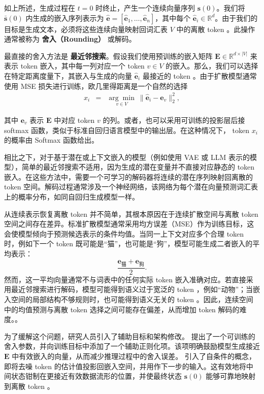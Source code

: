\documentclass[UTF8,a4paper,zihao=-4,oneside,openany]{ctexbook}
\begin{document}
如上所述，生成过程在 $t=0$ 时终止，产生一个连续向量序列 $\mathbf{s}(0)$。我们将 $\bar{\mathbf{s}}(0)$ 内生成的嵌入序列表示为 $\hat{\mathbf{e}} = [\hat{\mathbf{e}}_1, \dots, \hat{\mathbf{e}}_n]$，其中每个 $\hat{\mathbf{e}}_i \in \mathbb{R}^d$。由于我们的目标是生成文本，必须将这些连续向量映射回词汇表 $V$ 中的离散 token 。此操作通常被称为 \textbf{舍入（Rounding）} 或解码。

最直接的舍入方法是 \textbf{最近邻搜索}。假设我们使用预训练的嵌入矩阵 $\mathbf{E} \in \mathbb{R}^{d \times |V|}$ 来表示 token 嵌入，其中每一列对应一个 token $v \in V$ 的嵌入。那么，我们可以选择在特定距离度量下，其嵌入与生成的向量 $\hat{\mathbf{e}}_i$ 最接近的 token 。由于扩散模型通常使用 MSE 损失进行训练，欧几里得距离是一个自然的选择
\begin{eqnarray}
x_i & = & \underset{v \in V}{\arg\min} \ \|\hat{\mathbf{e}}_i - \mathbf{e}_v\|_2^2,
\end{eqnarray}

\noindent 其中 $\mathbf{e}_v$ 表示 $\mathbf{E}$ 中对应 token $v$ 的列。或者，也可以采用可训练的投影层后接 softmax 函数，类似于标准自回归语言模型中的输出层。在这种情况下， token $x_i$ 的概率由 Softmax 函数给出。

相比之下，对于基于潜在或上下文嵌入的模型（例如使用 VAE 或 LLM 表示的模型），简单的最近邻搜索不适用，因为生成的潜在变量并不直接对应静态的 token 嵌入。在这些方法中，需要一个可学习的解码器将连续的潜在序列映射回离散的 token 空间。解码过程通常涉及一个神经网络，该网络为每个潜在向量预测词汇表上的概率分布，如同自回归生成模型一样。

从连续表示恢复离散 token 并不简单，其根本原因在于连续扩散空间与离散 token 空间之间存在差异。标准扩散模型通常采用均方误差（MSE）作为训练目标，这会使模型倾向于预测候选表示的条件均值。当同一上下文对应多个合理 token 时，例如下一个 token 既可能是“猫”，也可能是“狗”，模型可能生成二者嵌入的平均表示：
\[
\frac{\mathbf{e}_{\text{猫}}+\mathbf{e}_{\text{狗}}}{2}.
\]
然而，这一平均向量通常不与词表中的任何实际 token 嵌入准确对应。若直接采用最近邻搜索进行解码，模型可能得到语义过于宽泛的 token ，例如“动物”；当嵌入空间的局部结构不够规则时，也可能得到语义无关的 token 。因此，连续空间中的均值预测与离散 token 选择之间可能存在偏差，从而增加 token 解码的难度。。

为了缓解这个问题，研究人员引入了辅助目标和架构修改。\citet{li-etal:2022diffusion} 提出了一个可训练的舍入参数，并向训练目标中添加了一个辅助正则化项。该项明确鼓励模型生成接近 $\mathbf{E}$ 中有效嵌入的向量，从而减少推理过程中的舍入误差。\citet{strudel-etal:2022self} 引入了自条件的概念，即将去噪 token 的估计值投影回嵌入空间，并用作下一步的输入。这有效地将中间状态钳制在更接近有效数据流形的位置，并使最终状态 $\mathbf{s}(0)$ 能够可靠地映射到离散 token 。
\end{document}
